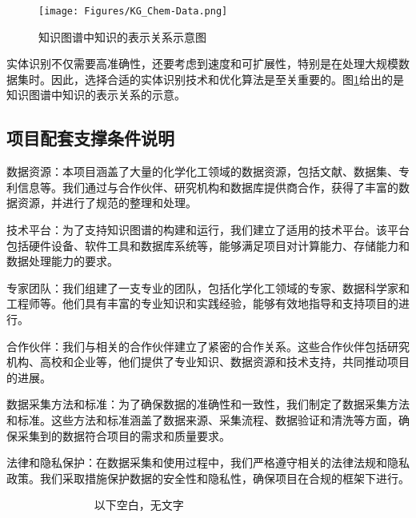 \begin{figure}[h!]
\centering
\texttt{[image: Figures/KG\_Chem-Data.png]}
\caption{\small\textrm{知识图谱中知识的表示关系示意图}}%
\label{Fig:KG-Chem_Data}
\end{figure}
实体识别不仅需要高准确性，还要考虑到速度和可扩展性，特别是在处理大规模数据集时。因此，选择合适的实体识别技术和优化算法是至关重要的。图\ref{Fig:KG-Chem_Data}给出的是知识图谱中知识的表示关系的示意。

\subsection{项目配套支撑条件说明} 
数据资源：本项目涵盖了大量的化学化工领域的数据资源，包括文献、数据集、专利信息等。我们通过与合作伙伴、研究机构和数据库提供商合作，获得了丰富的数据资源，并进行了规范的整理和处理。

技术平台：为了支持知识图谱的构建和运行，我们建立了适用的技术平台。该平台包括硬件设备、软件工具和数据库系统等，能够满足项目对计算能力、存储能力和数据处理能力的要求。

专家团队：我们组建了一支专业的团队，包括化学化工领域的专家、数据科学家和工程师等。他们具有丰富的专业知识和实践经验，能够有效地指导和支持项目的进行。

合作伙伴：我们与相关的合作伙伴建立了紧密的合作关系。这些合作伙伴包括研究机构、高校和企业等，他们提供了专业知识、数据资源和技术支持，共同推动项目的进展。

数据采集方法和标准：为了确保数据的准确性和一致性，我们制定了数据采集方法和标准。这些方法和标准涵盖了数据来源、采集流程、数据验证和清洗等方面，确保采集到的数据符合项目的需求和质量要求。

法律和隐私保护：在数据采集和使用过程中，我们严格遵守相关的法律法规和隐私政策。我们采取措施保护数据的安全性和隐私性，确保项目在合规的框架下进行。

\vskip 25pt
\begin{centering}
	\huge{~~~~~~~~~~~~~~~ 以下空白，无文字}
\end{centering}

